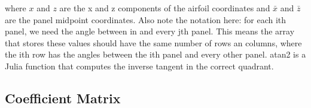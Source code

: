 \documentclass{article}%
\begin{document}
where $x$ and $z$ are the x and z components of the airfoil coordinates and $\bar{x}$ and $\bar{z}$ are the panel midpoint coordinates. Also note the notation here: for each ith panel, we need the angle between in and every jth panel. This means the array that stores these values should have the same number of rows an columns, where the ith row has the angles between the ith panel and every other panel. atan2 is a Julia function that computes the inverse tangent in the correct quadrant.

\subsection*{Coefficient Matrix}
\end{document}
